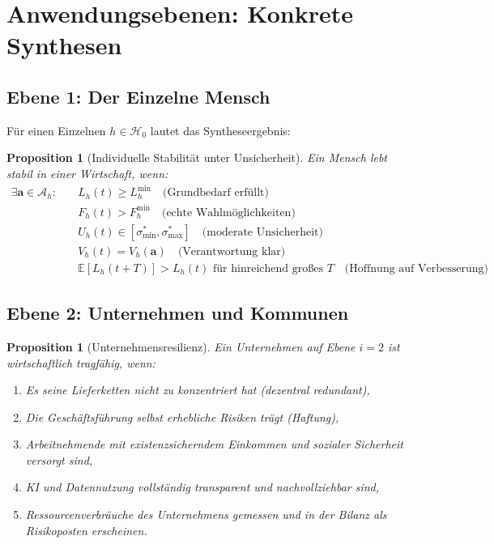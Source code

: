 \documentclass[a4paper, 12pt, twoside, openright]{report}
\newtheorem{proposition}[theorem]{Proposition}
\theoremstyle{definition}
\theoremstyle{definition}
\begin{document}
\section{Anwendungsebenen: Konkrete Synthesen}

\subsection{Ebene 1: Der Einzelne Mensch}

Für einen Einzelnen $h \in \mathcal{H}_0$ lautet das Syntheseergebnis:

\begin{proposition}[Individuelle Stabilität unter Unsicherheit]
Ein Mensch lebt stabil in einer Wirtschaft, wenn:
\begin{align}
\exists \mathbf{a} \in \mathcal{A}_h: \quad &L_h(t) \geq L_h^{\min} \quad \text{(Grundbedarf erfüllt)} \\
&F_h(t) > F_h^{\min} \quad \text{(echte Wahlmöglichkeiten)} \\
&U_h(t) \in [\sigma^*_{\min}, \sigma^*_{\max}] \quad \text{(moderate Unsicherheit)} \\
&V_h(t) = V_h(\mathbf{a}) \quad \text{(Verantwortung klar)} \\
&\mathbb{E}[L_h(t+T)] > L_h(t) \text{ für hinreichend großes } T \quad \text{(Hoffnung auf Verbesserung)}
\end{align}
\end{proposition}

\subsection{Ebene 2: Unternehmen und Kommunen}

\begin{proposition}[Unternehmensresilienz]
Ein Unternehmen auf Ebene $i=2$ ist wirtschaftlich tragfähig, wenn:
\begin{enumerate}
\item Es seine Lieferketten nicht zu konzentriert hat (dezentral redundant),
\item Die Geschäftsführung selbst erhebliche Risiken trägt (Haftung),
\item Arbeitnehmende mit existenzsicherndem Einkommen und sozialer Sicherheit versorgt sind,
\item KI und Datennutzung vollständig transparent und nachvollziehbar sind,
\item Ressourcenverbräuche des Unternehmens gemessen und in der Bilanz als Risikoposten erscheinen.
\end{enumerate}
\end{proposition}
\end{document}

